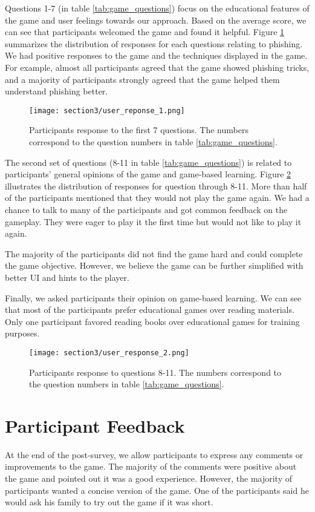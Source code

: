 Questions 1-7 (in table \ref{tab:game_questions}) focus on the educational features of the game and user feelings towards our approach. Based on the average score, we can see that participants welcomed the game and found it helpful. Figure \ref{fig:phishing_game_questions_1} summarizes the distribution of responses for each questions relating to phishing. We had positive responses to the game and the techniques displayed in the game. For example, almost all participants agreed that the game showed phishing tricks, and a majority of participants strongly agreed that the game helped them understand phishing better.

\begin{figure}[!ht]
    \centering
    \texttt{[image: section3/user\_reponse\_1.png]}
    \caption[Responses to the first 7 questions]{Participants response to the first 7 questions. The numbers correspond to the question numbers in table \ref{tab:game_questions}.}
    \label{fig:phishing_game_questions_1}
\end{figure}

The second set of questions (8-11 in table \ref{tab:game_questions}) is related to participants' general opinions of the game and game-based learning. Figure \ref{fig:phishing_game_questions_2} illustrates the distribution of responses for question through 8-11.  More than half of the participants mentioned that they would not play the game again. We had a chance to talk to many of the participants and got common feedback on the gameplay. They were eager to play it the first time but would not like to play it again.

The majority of the participants did not find the game hard and could complete the game objective. However, we believe the game can be further simplified with better UI and hints to the player.

Finally, we asked participants their opinion on game-based learning. We can see that most of the participants prefer educational games over reading materials. Only one participant favored reading books over educational games for training purposes.


\begin{figure}[!ht]
    \centering
    \texttt{[image: section3/user\_response\_2.png]}
    \caption[Responses to the 2nd set of questions]{Participants response to questions 8-11. The numbers correspond to the question numbers in table \ref{tab:game_questions}.}
    \label{fig:phishing_game_questions_2}
\end{figure}


\section{Participant Feedback}
At the end of the post-survey, we allow participants to express any comments or improvements to the game. The majority of the comments were positive about the game and pointed out it was a good experience. However, the majority of participants wanted a concise version of the game. One of the participants said he would ask his family to try out the game if it was short.

